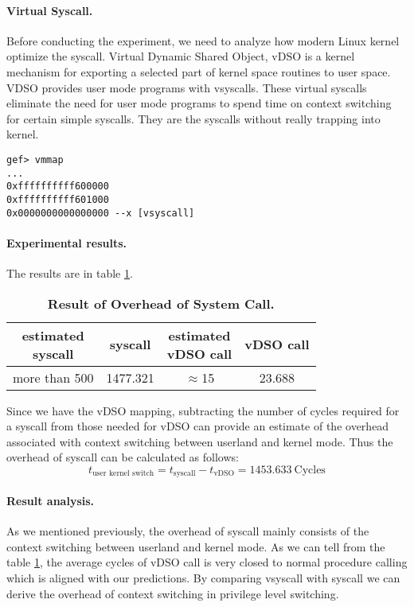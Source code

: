 \paragraph{Virtual Syscall.} Before conducting the experiment, we need to analyze how modern Linux kernel optimize the syscall. Virtual Dynamic Shared Object, vDSO is a kernel mechanism for exporting a selected part of kernel space routines to user space. VDSO provides user mode programs with vsyscalls. These virtual syscalls eliminate the need for user mode programs to spend time on context switching for certain simple syscalls. They are the syscalls without really trapping into kernel.

\begin{lstlisting}[caption=vDSO mapping]
gef> vmmap
...
0xffffffffff600000 
0xffffffffff601000 
0x0000000000000000 --x [vsyscall]
\end{lstlisting}

\paragraph{Experimental results.} The results are in table \ref{table:syscall-test}.
\begin{table}[h]
	\centering
	\begin{tabular}{c|c|c|c}
		\hline
		\makecell{estimated \\ syscall} & \bf{syscall} & \makecell{estimated \\ vDSO call} & \bf{vDSO call} \\ \hline
        more than 500 & 1477.321 & $\approx$15 & 23.688 \\ \hline
	\end{tabular}
	\caption{\textbf{Result of Overhead of System Call.}}
	\label{table:syscall-test}
\end{table}
Since we have the vDSO mapping, subtracting the number of cycles required for a syscall from those needed for vDSO can provide an estimate of the overhead associated with context switching between userland and kernel mode. Thus the overhead of syscall can be calculated as follows:
\begin{equation}
    t_{\text{user\ kernel\ switch}}=t_{\text{syscall}}-t_{\text{vDSO}}=1453.633\ \text{Cycles}
\end{equation}

\paragraph{Result analysis.} As we mentioned previously, the overhead of syscall mainly consists of the context switching between userland and kernel mode. As we can tell from the table \ref{table:syscall-test}, the average cycles of vDSO call is very closed to normal procedure calling which is aligned with our predictions. By comparing vsyscall with syscall we can derive the overhead of context switching in privilege level switching.

